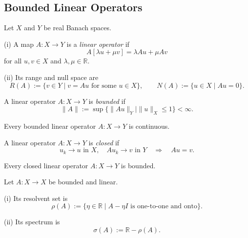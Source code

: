 \subsection{Bounded Linear Operators}
\label{sec:bounded-linear-operators}

Let $X$ and $Y$ be real Banach spaces.

\begin{definition}
\label{def:linear-operator-banach}
(i) A map $A:X\to Y$ is a \textit{linear operator} if
\[
A[\lambda u+\mu v]=\lambda Au+\mu Av
\]
for all $u,v\in X$ and $\lambda,\mu\in\mathbb R$.

(ii) Its range and null space are
\[
R(A):=\{v\in Y\mid v=Au\text{ for some }u\in X\},
\qquad
N(A):=\{u\in X\mid Au=0\}.
\]
\end{definition}

\begin{definition}
\label{def:bounded-linear-operator}
A linear operator $A:X\to Y$ is \textit{bounded} if
\[
\|A\|:=\sup\{\|Au\|_Y\mid\|u\|_X\leq1\}<\infty.
\]
\end{definition}

Every bounded linear operator $A:X\to Y$ is continuous.

\begin{definition}
\label{def:closed-linear-operator}
A linear operator $A:X\to Y$ is \textit{closed} if
\[
u_k\to u\text{ in }X,\quad Au_k\to v\text{ in }Y
\quad\Longrightarrow\quad Au=v.
\]
\end{definition}

\begin{theorem}
\label{thm:closed-graph-theorem}
Every closed linear operator $A:X\to Y$ is bounded.
\end{theorem}

\begin{definition}
\label{def:resolvent-set-spectrum-appendix-d}
Let $A:X\to X$ be bounded and linear.

(i) Its resolvent set is
\[
\rho(A):=\{\eta\in\mathbb R\mid A-\eta I
\text{ is one-to-one and onto}\}.
\]

(ii) Its spectrum is
\[
\sigma(A):=\mathbb R-\rho(A).
\]
\end{definition}

